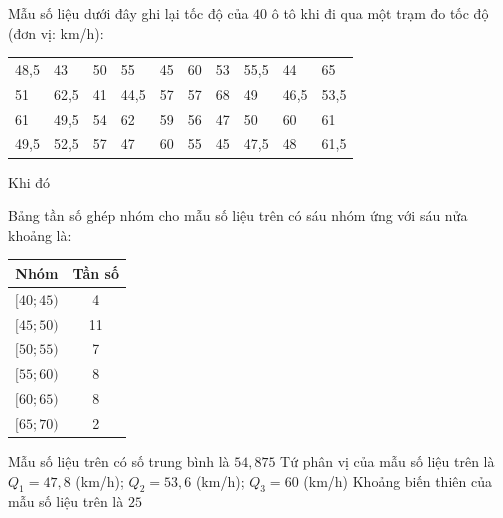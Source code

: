 \begin{ex}%
	Mẫu số liệu dưới đây ghi lại tốc độ của $40$ ô tô khi đi qua một trạm đo tốc độ (đơn vị: km/h):
	\begin{center}
			\begin{tabular}{llllllllll}
					48{,}5 & 43 & 50 & 55 & 45 & 60 & 53 & 55{,}5 & 44 & 65 \\
					51 & 62{,}5 & 41 & 44{,}5 & 57 & 57 & 68 & 49 & 46{,}5 & 53{,}5 \\
					61 & 49{,}5 & 54 & 62 & 59 & 56 & 47 & 50 & 60 & 61 \\
					49{,}5 & 52{,}5 & 57 & 47 & 60 & 55 & 45 & 47{,}5 & 48 & 61{,}5
				\end{tabular}
		\end{center}
		Khi đó
	\choiceTF
	{\True Bảng tần số ghép nhóm cho mẫu số liệu trên có sáu nhóm ứng với sáu nửa khoảng là:	\\	
			\begin{tabular}{|c|c|}
				\hline
				Nhóm & Tần số \\
				\hline
				$[40;45)$ & 4 \\
				{$[45;50)$} & 11 \\
				{$[50;55)$} & 7 \\
				{$[55;60)$} & 8 \\
				{$[60;65)$} & 8 \\
				{$[65;70)$} & 2 \\
				\hline
			\end{tabular}
	}
	{Mẫu số liệu trên có số trung bình là $54{,}875$}
	{\True Tứ phân vị của mẫu số liệu trên là \\ $Q_1=47{,}8$ (km/h); $Q_2=53{,}6$ (km/h); $Q_3=60$ (km/h)}
	{Khoảng biến thiên của mẫu số liệu trên là $25$}
	\loigiai{
			\begin{itemchoice}
			\itemch Đúng. Bảng tần số ghép nhóm:
					\begin{center}
							\begin{tabular}{|c|c|}
									\hline
									Nhóm & Tần số \\
									\hline
									$[40;45)$ & 4 \\
									{$[45;50)$} & 11 \\

\end{tabular}
\end{center}
\end{itemchoice}}
\end{ex}
